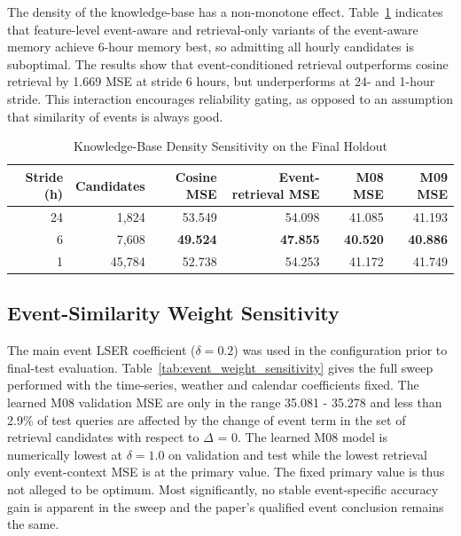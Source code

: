 \documentclass{ieeeaccess}
\begin{document}
The density of the knowledge-base has a non-monotone effect. Table~\ref{tab:stride_sweep} indicates that feature-level event-aware and retrieval-only variants of the event-aware memory achieve 6-hour memory best, so admitting all hourly candidates is suboptimal. The results show that event-conditioned retrieval outperforms cosine retrieval by 1.669 MSE at stride 6 hours, but underperforms at 24- and 1-hour stride. This interaction encourages reliability gating, as opposed to an assumption that similarity of events is always good.

\begin{table}[!t]
\centering
\caption{Knowledge-Base Density Sensitivity on the Final Holdout}
\label{tab:stride_sweep}
\begin{tabular}{rrrrrr}
\toprule
Stride (h) & Candidates & Cosine MSE & Event-retrieval MSE & M08 MSE & M09 MSE \\
\midrule
24 & 1,824 & 53.549 & 54.098 & 41.085 & 41.193 \\
6 & 7,608 & \textbf{49.524} & \textbf{47.855} & \textbf{40.520} & \textbf{40.886} \\
1 & 45,784 & 52.738 & 54.253 & 41.172 & 41.749 \\
\bottomrule
\end{tabular}
\end{table}

\subsection{Event-Similarity Weight Sensitivity}
The main event LSER coefficient ($\delta=0.2$) was used in the configuration prior to final-test evaluation. Table~\ref{tab:event_weight_sensitivity} gives the full sweep performed with the time-series, weather and calendar coefficients fixed. The learned M08 validation MSE are only in the range 35.081 - 35.278 and less than 2.9\% of test queries are affected by the change of event term in the set of retrieval candidates with respect to $\Delta$ = 0. The learned M08 model is numerically lowest at $\delta=1.0$ on validation and test while the lowest retrieval only event-context MSE is at the primary value. The fixed primary value is thus not alleged to be optimum. Most significantly, no stable event-specific accuracy gain is apparent in the sweep and the paper's qualified event conclusion remains the same.
\end{document}
